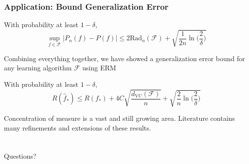 \documentclass{beamer}
\begin{document}
\begin{frame}
\frametitle{Application: Bound Generalization Error} 

\begin{block}{}
With probability at least $1 - \delta$, 
$$ \sup_{f \in \mathcal{F}} | P_n(f) - P(f) | \leq 2 \text{Rad}_n(\mathcal{F}) + \sqrt{\frac{1}{2n} \ln \bigg( \frac{2}{\delta} \bigg)} $$
\end{block}

Combining everything together, we have showed a generalization error bound for any learning algorithm $\mathcal{F}$ using ERM 
\begin{block}{}
With probability at least $1 - \delta$, 
$$ R(\widehat{f}_{*}) \leq R(f_{*}) + 4 C \sqrt{\frac{d_{\text{VC}}(\mathcal{F})}{n}} + \sqrt{\frac{2}{n} \ln \bigg( \frac{2}{\delta} \bigg)} $$
\end{block}

Concentration of measure is a vast and still growing area. Literature contains many refinements and extensions of these results. 

\end{frame}


\section*{}
\begin{frame}
\Huge{\centerline{Questions?}}
\end{frame}

\end{document}
